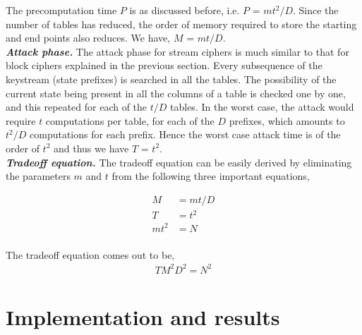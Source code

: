 The precomputation time $P$ is as discussed before, i.e. $P$ = $mt^2/D$. Since the number of tables has reduced, the order of memory required to store the starting and end points also reduces. We have, $M$ = $mt/D$.\\

\noindent \textit{\textbf{Attack phase.}} The attack phase for stream ciphers is much similar to that for block ciphers explained in the previous section. Every subsequence of the keystream (state prefixes) is searched in all the tables. The possibility of the current state being present in all the columns of a table is checked one by one, and this repeated for each of the $t/D$ tables. In the worst case, the attack would require $t$ computations per table, for each of the $D$ prefixes, which amounts to $t^2/D$ computations for each prefix. Hence the worst case attack time is of the order of $t^2$ and thus we have $T$ = $t^2$.\\

\noindent \textit{\textbf{Tradeoff equation.}} The tradeoff equation can be easily derived by eliminating the parameters $m$ and $t$ from the following three important equations,

\begin{align*}
M &= mt/D\\
T &= t^2\\
mt^2 &= N\\
\end{align*}

The tradeoff equation comes out to be,
\begin{align}
\label{eq:tmdto-hellman-stream} TM^2D^2 = N^2
\end{align}

\section{Implementation and results}


	

